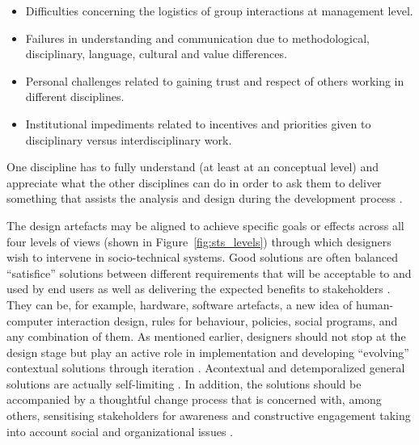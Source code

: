 \begin{itemize}
\item Difficulties concerning the logistics of group interactions at management level. 
\item Failures in understanding and communication due to methodological, disciplinary, language, cultural and value differences. 
\item  Personal challenges related to gaining trust and respect of others working in different disciplines.
\item  Institutional impediments related to incentives and priorities given to disciplinary versus interdisciplinary work.
\end{itemize}
% 
One discipline has to fully understand (at least at an conceptual level) and appreciate what the other disciplines can do in order to ask them to deliver something that assists the analysis and design during the development process \cite{Baxter2011}. 


The design artefacts may be aligned to achieve specific goals or effects across all four levels of views (shown in Figure~\ref{fig:sts_levels}) through which designers wish to intervene in socio-technical systems. Good solutions are often balanced ``satisfice'' solutions between different requirements that will be acceptable to and used by end users as well as delivering the expected benefits to stakeholders \cite{Baxter2011,Norman2015}. 
They can be, for example, hardware, software artefacts, a new idea of human-computer interaction design, rules for behaviour, policies, social programs, and any combination of them. As mentioned earlier, designers should not stop at the design stage but play an active role in implementation and developing ``evolving'' contextual solutions through iteration \cite{Norman2015}. Acontextual and detemporalized general solutions are actually self-limiting \cite{Sawyer2014}. 
% 
In addition, the solutions should be accompanied by a thoughtful change process that is concerned with, among others, sensitising stakeholders for awareness and constructive engagement taking into account social and organizational issues \cite{Baxter2011}.


%
%
%


